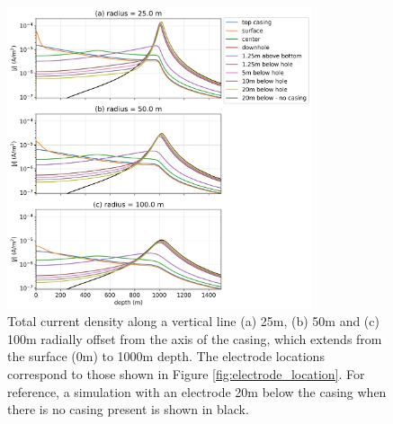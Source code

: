 \begin{figure}
    \begin{center}
    \includegraphics[width=0.8\textwidth]{figures/electrode_location_currents.png}
    \end{center}
\caption{
    Total current density along a vertical line (a) 25m, (b) 50m and (c) 100m
    radially offset from the axis of the casing, which extends
    from the surface (0m) to 1000m depth.
    The electrode locations correspond to those shown in Figure \ref{fig:electrode_location}.
    For reference, a simulation with an electrode 20m below the casing when there is no casing present
    is shown in black.
}
\label{fig:electrode_location_currents}
\end{figure}
